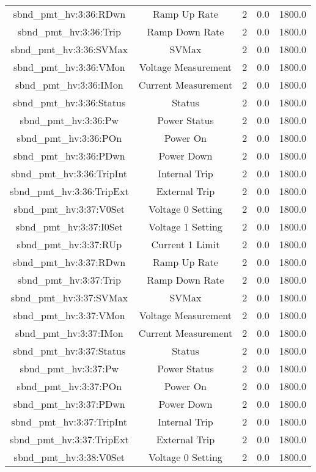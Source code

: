 \begin{center}
\begin{longtable}{c | c c c c }
sbnd\_pmt\_hv:3:36:RDwn & Ramp Up Rate & 2 & 0.0 & 1800.0\\ 
sbnd\_pmt\_hv:3:36:Trip & Ramp Down Rate & 2 & 0.0 & 1800.0\\ 
sbnd\_pmt\_hv:3:36:SVMax & SVMax & 2 & 0.0 & 1800.0\\ 
sbnd\_pmt\_hv:3:36:VMon & Voltage Measurement & 2 & 0.0 & 1800.0\\ 
sbnd\_pmt\_hv:3:36:IMon & Current Measurement & 2 & 0.0 & 1800.0\\ 
sbnd\_pmt\_hv:3:36:Status & Status & 2 & 0.0 & 1800.0\\ 
sbnd\_pmt\_hv:3:36:Pw & Power Status & 2 & 0.0 & 1800.0\\ 
sbnd\_pmt\_hv:3:36:POn & Power On & 2 & 0.0 & 1800.0\\ 
sbnd\_pmt\_hv:3:36:PDwn & Power Down & 2 & 0.0 & 1800.0\\ 
sbnd\_pmt\_hv:3:36:TripInt & Internal Trip & 2 & 0.0 & 1800.0\\ 
sbnd\_pmt\_hv:3:36:TripExt & External Trip & 2 & 0.0 & 1800.0\\ 
sbnd\_pmt\_hv:3:37:V0Set & Voltage 0 Setting & 2 & 0.0 & 1800.0\\ 
sbnd\_pmt\_hv:3:37:I0Set & Voltage 1 Setting & 2 & 0.0 & 1800.0\\ 
sbnd\_pmt\_hv:3:37:RUp & Current 1 Limit & 2 & 0.0 & 1800.0\\ 
sbnd\_pmt\_hv:3:37:RDwn & Ramp Up Rate & 2 & 0.0 & 1800.0\\ 
sbnd\_pmt\_hv:3:37:Trip & Ramp Down Rate & 2 & 0.0 & 1800.0\\ 
sbnd\_pmt\_hv:3:37:SVMax & SVMax & 2 & 0.0 & 1800.0\\ 
sbnd\_pmt\_hv:3:37:VMon & Voltage Measurement & 2 & 0.0 & 1800.0\\ 
sbnd\_pmt\_hv:3:37:IMon & Current Measurement & 2 & 0.0 & 1800.0\\ 
sbnd\_pmt\_hv:3:37:Status & Status & 2 & 0.0 & 1800.0\\ 
sbnd\_pmt\_hv:3:37:Pw & Power Status & 2 & 0.0 & 1800.0\\ 
sbnd\_pmt\_hv:3:37:POn & Power On & 2 & 0.0 & 1800.0\\ 
sbnd\_pmt\_hv:3:37:PDwn & Power Down & 2 & 0.0 & 1800.0\\ 
sbnd\_pmt\_hv:3:37:TripInt & Internal Trip & 2 & 0.0 & 1800.0\\ 
sbnd\_pmt\_hv:3:37:TripExt & External Trip & 2 & 0.0 & 1800.0\\ 
sbnd\_pmt\_hv:3:38:V0Set & Voltage 0 Setting & 2 & 0.0 & 1800.0\\ 

\end{longtable}
\end{center}
